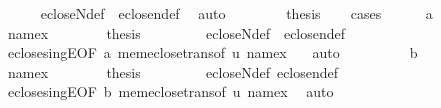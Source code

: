 \begin{isabellebody}
\ \ \ \ \isamarkupfalse%
\ ecloseN{\isacharunderscore}{\kern0pt}def\ \ eclose{\isacharunderscore}{\kern0pt}n{\isacharunderscore}{\kern0pt}def\ \isamarkupfalse%
\ auto\isanewline
\ \ \isamarkupfalse%
\ \isanewline
\ \ \isamarkupfalse%
\ {\isacharquery}{\kern0pt}thesis\isanewline
\ \ \isamarkupfalse%
\ cases\isanewline
\ \ \ \ \isamarkupfalse%
\ a\isanewline
\ \ \ \ \isamarkupfalse%
\ {\isacartoucheopen}name{}{\isacharparenleft}{\kern0pt}x{\isacharparenright}{\kern0pt}\ {\isasymin}\ {\isacharunderscore}{\kern0pt}{\isacartoucheclose}\isanewline
\ \ \ \ \isamarkupfalse%
\ {\isacharquery}{\kern0pt}thesis\ \isanewline
\ \ \ \ \ \ \isamarkupfalse%
\ ecloseN{\isacharunderscore}{\kern0pt}def\ \ eclose{\isacharunderscore}{\kern0pt}n{\isacharunderscore}{\kern0pt}def\isanewline
\ \ \ \ \ \ \isamarkupfalse%
\ eclose{\isacharunderscore}{\kern0pt}singE{\isacharbrackleft}{\kern0pt}OF\ a{\isacharbrackright}{\kern0pt}\ mem{\isacharunderscore}{\kern0pt}eclose{\isacharunderscore}{\kern0pt}trans{\isacharbrackleft}{\kern0pt}of\ u\ {\isachardoublequoteopen}name{}{\isacharparenleft}{\kern0pt}x{\isacharparenright}{\kern0pt}{\isachardoublequoteclose}\ {\isacharbrackright}{\kern0pt}\ \isamarkupfalse%
\ auto\ \isanewline
\ \ \isamarkupfalse%
\isanewline
\ \ \ \ \isamarkupfalse%
\ b\isanewline
\ \ \ \ \isamarkupfalse%
\ {\isacartoucheopen}name{}{\isacharparenleft}{\kern0pt}x{\isacharparenright}{\kern0pt}\ {\isasymin}\ {\isacharunderscore}{\kern0pt}{\isacartoucheclose}\isanewline
\ \ \ \ \isamarkupfalse%
\ {\isacharquery}{\kern0pt}thesis\ \isanewline
\ \ \ \ \ \ \isamarkupfalse%
\ ecloseN{\isacharunderscore}{\kern0pt}def\ eclose{\isacharunderscore}{\kern0pt}n{\isacharunderscore}{\kern0pt}def\isanewline
\ \ \ \ \ \ \isamarkupfalse%
\ eclose{\isacharunderscore}{\kern0pt}singE{\isacharbrackleft}{\kern0pt}OF\ b{\isacharbrackright}{\kern0pt}\ mem{\isacharunderscore}{\kern0pt}eclose{\isacharunderscore}{\kern0pt}trans{\isacharbrackleft}{\kern0pt}of\ u\ {\isachardoublequoteopen}name{}{\isacharparenleft}{\kern0pt}x{\isacharparenright}{\kern0pt}{\isachardoublequoteclose}{\isacharbrackright}{\kern0pt}\ \isamarkupfalse%
\ auto\isanewline
\ \ \isamarkupfalse%
\isanewline
{}\isamarkupfalse%
%
\endisatagproof

\end{isabellebody}
